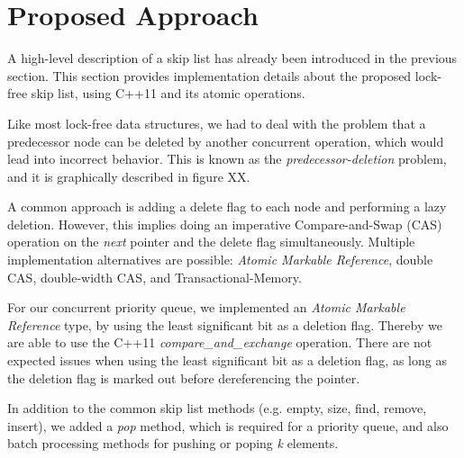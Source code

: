 \section{Proposed Approach}\label{sec:approach}
A high-level description of a skip list has already been introduced in the previous section.
This section provides implementation details about the proposed lock-free skip list, using C++11 and its atomic operations.

Like most lock-free data structures, we had to deal with the problem that a predecessor node can be deleted by another concurrent operation, which would lead into incorrect behavior. This is known as the {\em predecessor-deletion} problem, and it is graphically described in figure XX.%

A common approach is adding a delete flag to each node and performing a lazy deletion. However, this implies doing an imperative Compare-and-Swap (CAS) operation on the {\em next} pointer and the delete flag simultaneously.
Multiple implementation alternatives are possible: {\em Atomic Markable Reference}, double CAS, double-width CAS, and Transactional-Memory.

For our concurrent priority queue, we implemented an {\em Atomic Markable Reference} type, by using the least significant bit as a deletion flag. Thereby we are able to use the C++11 {\em compare\_and\_exchange} operation.
There are not expected issues when using the least significant bit as a deletion flag, as long as the deletion flag is marked out before dereferencing the pointer.

In addition to the common skip list methods (e.g. empty, size, find, remove, insert), we added a \textit{pop} method, which is required for a priority queue, and also batch processing methods for pushing or poping \textit{k} elements.



